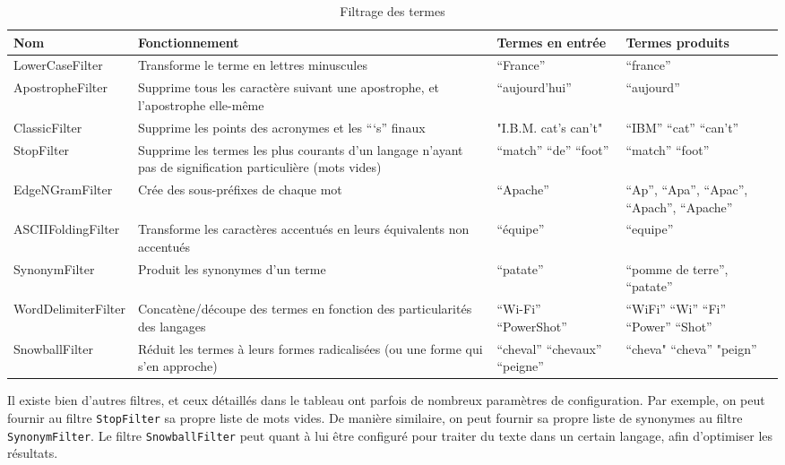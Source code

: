\begin{table}[!htbp]
                \centering
                \begin{tabular}{|p{3cm}|p{3cm}|p{3cm}|p{3cm}|}
                    \hline
                    \textbf{Nom} & \textbf{Fonctionnement} & \textbf{Termes en entrée} & \textbf{Termes produits}\\
                    \hline
LowerCaseFilter & Transforme le terme en lettres minuscules & “France” & “france”\\
\hline
ApostropheFilter & Supprime tous les caractère suivant une apostrophe, et l’apostrophe elle-même & “aujourd’hui” & “aujourd”\\
\hline
ClassicFilter & Supprime les points des acronymes et les “‘s” finaux & "I.B.M. cat's can't" & “IBM” “cat” “can’t”\\
\hline
StopFilter & Supprime les termes les plus courants d’un langage n’ayant pas de signification particulière (mots vides) & “match” “de” “foot” & “match” “foot”\\
\hline
EdgeNGramFilter & Crée des sous-préfixes de chaque mot & “Apache” & “Ap”, “Apa”, “Apac”, “Apach”, “Apache”\\
\hline
ASCIIFoldingFilter & Transforme les caractères accentués en leurs équivalents non accentués & “équipe” & “equipe”\\
\hline
SynonymFilter & Produit les synonymes d’un terme & “patate” & “pomme de terre”, “patate”\\
\hline
WordDelimiterFilter & Concatène/découpe des termes en fonction des particularités des langages & “Wi-Fi” “PowerShot” & “WiFi” “Wi” “Fi” “Power” “Shot”\\
\hline
SnowballFilter & Réduit les termes à leurs formes radicalisées (ou une forme qui s’en approche) & “cheval”  “chevaux”  “peigne” & “cheva" “cheva” "peign”\\
                    \hline

                \end{tabular}
                \caption{Filtrage des termes}
                \label{tab:filtrage_termes}
            \end{table}

Il existe bien d’autres filtres, et ceux détaillés dans le tableau ont parfois de nombreux paramètres de configuration. Par exemple, on peut fournir au filtre \texttt{StopFilter} sa propre liste de mots vides. De manière similaire, on peut fournir sa propre liste de synonymes au filtre \texttt{SynonymFilter}. Le filtre \texttt{SnowballFilter} peut quant à lui être configuré pour traiter du texte dans un certain langage, afin d’optimiser les résultats.

